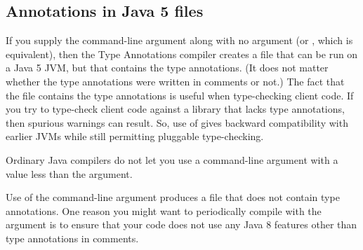 \subsection{Annotations in Java 5  files\label{java5-class-files}}

If you supply the  command-line argument along with no
 argument (or , which is equivalent), then the
Type Annotations compiler creates a  file that can be run on a
Java 5 JVM, but that contains the type annotations.  (It does not matter
whether the type annotations were written in comments or not.)  The fact
that the  file contains the type annotations is useful when
type-checking client code.  If you try to type-check client code against a
library that lacks type annotations, then spurious warnings can result.
So, use of  gives backward compatibility with earlier JVMs
while still permitting pluggable type-checking.

Ordinary Java compilers do not let you use a  command-line
argument with a value less than the  argument.

Use of the  command-line argument produces a 
file that does not contain type annotations.  One reason you might want to
periodically compile with the  argument is to ensure that
your code does not use any Java 8 features other than type annotations in
comments.


